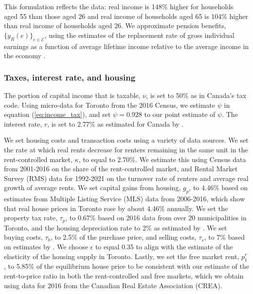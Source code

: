 \documentclass[parskip=full]{article}
\begin{document}
\noindent This formulation reflects the data: real income is 148\% higher for households aged 55 than those aged 26 and real income of households aged 65 is 104\% higher than real income of households aged 26. We approximate pension benefits, $\{y_{R}(e)\}_{e\in \mathcal{E}}$, using the estimates of the replacement rate of gross individual earnings as a function of average lifetime income relative to the average income in the economy \citep{OECD-pension}.

\subsubsection{Taxes, interest rate, and housing}

The portion of capital income that is taxable, $\nu$, is set to 50\% as in Canada's tax code. Using micro-data for Toronto from the 2016 Census, we estimate $\psi$ in equation (\ref{eq:income_tax}), and set $\psi=0.928$ to our point estimate of $\psi$. The interest rate, $r$, is set to 2.77\% as estimated for Canada by \citet{bruneau-etal-2018}. 


We set housing costs and transaction costs using a variety of data sources. We set the rate at which real rents decrease for renters remaining in the same unit in the rent-controlled market, $\kappa$, to equal to 2.70\%. We estimate this using Census data from 2001-2016 on the share of the rent-controlled market, and Rental Market Survey (RMS) data for 1992-2021 on the turnover rate of renters and average real growth of average rents. We set capital gains from housing, $g_{p}$, to 4.46\% based on estimates from Multiple Listing Service (MLS) data from 2006-2016, which show that real house prices in Toronto rose by about 4.46\% annually. We set the property tax rate, $\tau_p$, to 0.67\% based on 2016 data from over 20 municipalities in Toronto, and the housing depreciation rate to 2\% as estimated by \citet{hardingetal-2007}. We set buying costs, $\tau_{b}$, to 2.5\% of the purchase price, and selling costs, $\tau_{s}$, to 7\% based on estimates by \citet{gm-2003}. We choose $\epsilon$ to equal 0.35 to align with the \citet{cmhc-report-2018} estimate of the elasticity of the housing supply in Toronto. Lastly, we set the free market rent, $p^{r}_{1}$, to 5.85\% of the equilibrium house price to be consistent with our estimate of the rent-to-price ratio in both the rent-controlled and free markets, which we obtain using data for 2016 from the Canadian Real Estate Association (CREA).
\end{document}
